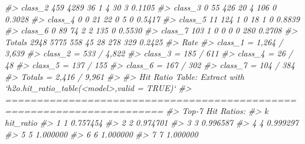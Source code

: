 \documentclass[]{book}
\newenvironment{Shaded}{\begin{snugshade}}{\end{snugshade}}
\newcommand{\CommentTok}[1]{\textcolor[rgb]{0.56,0.35,0.01}{\textit{#1}}}
\begin{document}
\begin{Shaded}
\begin{Highlighting}[]
{{{\CommentTok{#> class_2     459    4289      36       1       4      30       3 0.1105}
\CommentTok{#> class_3       0      55     426      20       4     106       0 0.3028}
\CommentTok{#> class_4       0       0      21      22       0       5       0 0.5417}
\CommentTok{#> class_5      11     124       1       0      18       1       0 0.8839}
\CommentTok{#> class_6       0      89      74       2       2     135       0 0.5530}
\CommentTok{#> class_7     103       1       0       0       0       0     280 0.2708}
\CommentTok{#> Totals     2948    5775     558      45      28     278     329 0.2425}
\CommentTok{#>                    Rate}
\CommentTok{#> class_1 = 1,264 / 3,639}
\CommentTok{#> class_2 =   533 / 4,822}
\CommentTok{#> class_3 =     185 / 611}
\CommentTok{#> class_4 =       26 / 48}
\CommentTok{#> class_5 =     137 / 155}
\CommentTok{#> class_6 =     167 / 302}
\CommentTok{#> class_7 =     104 / 384}
\CommentTok{#> Totals  = 2,416 / 9,961}
\CommentTok{#> }
\CommentTok{#> Hit Ratio Table: Extract with `h2o.hit_ratio_table(<model>,valid = TRUE)`}
\CommentTok{#> =======================================================================}
\CommentTok{#> Top-7 Hit Ratios: }
\CommentTok{#>   k hit_ratio}
\CommentTok{#> 1 1  0.757454}
\CommentTok{#> 2 2  0.974701}
\CommentTok{#> 3 3  0.996587}
\CommentTok{#> 4 4  0.999297}
\CommentTok{#> 5 5  1.000000}
\CommentTok{#> 6 6  1.000000}
\CommentTok{#> 7 7  1.000000}

}}}
\end{Highlighting}
\end{Shaded}
\end{document}
